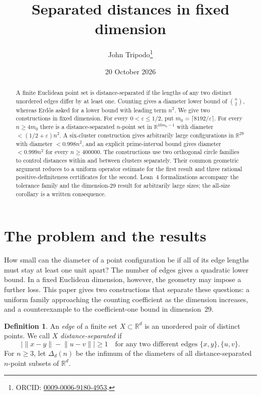 \documentclass[11pt]{article}
\title{Separated distances in fixed dimension}
\author{John Tripodo\thanks{ORCID: \href{https://orcid.org/0009-0006-9180-4953}{0009-0006-9180-4953}.}}
\date{20 October 2026}
\numberwithin{equation}{section}
\theoremstyle{definition}\newtheorem{definition}[theorem]{Definition}
\theoremstyle{remark}\newtheorem{remark}[theorem]{Remark}
\newcommand{\R}{\mathbb R}\newcommand{\N}{\mathbb N}
\newcommand{\norm}[1]{\lVert #1\rVert}
\begin{document}
\maketitle

\begin{abstract}
A finite Euclidean point set is distance-separated if the lengths of any
two distinct unordered edges differ by at least one. Counting gives a
diameter lower bound of $\binom n2$, whereas Erd\H{o}s asked for a lower
bound with leading term $n^2$. We give two constructions in fixed dimension.
For every $0<\varepsilon\le1/2$, put $m_0=\lceil8192/\varepsilon\rceil$.
For every $n\ge4m_0$ there is a distance-separated $n$-point set in
$\R^{10m_0-1}$ with diameter $<(1/2+\varepsilon)n^2$.
A six-cluster construction gives arbitrarily large configurations in
$\R^{29}$ with diameter $<0.998n^2$, and an explicit prime-interval bound
gives diameter $<0.999n^2$ for every $n\ge400000$.
The constructions use two orthogonal circle families to control distances
within and between clusters separately. Their common geometric argument
reduces to a uniform operator estimate for the first result and three
rational positive-definiteness certificates for the second.
Lean~4 formalizations accompany the tolerance family and the
dimension-29 result for arbitrarily large sizes; the all-size corollary is a
written consequence.
\end{abstract}

\medskip

\section{The problem and the results}\label{sec:intro}

How small can the diameter of a point configuration be if all of its edge
lengths must stay at least one unit apart? The number of edges gives a
quadratic lower bound. In a fixed Euclidean dimension, however, the geometry
may impose a further loss. This paper gives two constructions that separate
these questions: a uniform family approaching the counting coefficient as
the dimension increases, and a counterexample to the coefficient-one bound
in dimension~29.

\begin{definition}
An \emph{edge} of a finite set $X\subset\R^d$ is an unordered pair of distinct
points. We call $X$ \emph{distance-separated} if
\begin{equation}\label{eq:separated}
 \bigl|\norm{x-y}-\norm{u-v}\bigr|\ge1
 \quad\text{for any two different edges }\{x,y\},\{u,v\}.
\end{equation}
For $n\ge3$, let $\Delta_d(n)$ be the infimum of the diameters of all
distance-separated $n$-point subsets of $\R^d$.
\end{definition}
\end{document}
